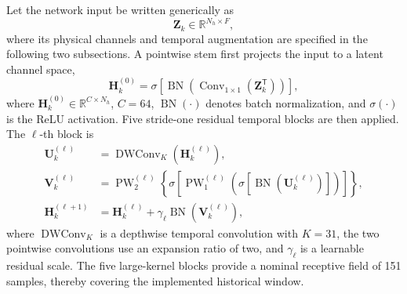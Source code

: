 \documentclass{ieeeaccess}
\begin{document}
Let the network input be written generically as
\begin{equation}
\mathbf Z_k\in\mathbb R^{N_h\times F},
\label{eq:generic_moderntcn_input}
\end{equation}
where its physical channels and temporal augmentation are specified in the following two subsections. A pointwise stem first projects the input to a latent channel space,
\begin{equation}
\mathbf H_k^{(0)}=\sigma\!\left[
\operatorname{BN}\!\left(
\operatorname{Conv}_{1\times1}(\mathbf Z_k^{\mathsf T})
\right)\right],
\label{eq:moderntcn_stem}
\end{equation}
where $\mathbf H_k^{(0)}\in\mathbb R^{C\times N_h}$, $C=64$, $\operatorname{BN}(\cdot)$ denotes batch normalization, and $\sigma(\cdot)$ is the ReLU activation. Five stride-one residual temporal blocks are then applied. The $\ell$-th block is
\begin{align}
\mathbf U_k^{(\ell)}
 &=\operatorname{DWConv}_{K}\!\left(\mathbf H_k^{(\ell)}\right),\nonumber\\
\mathbf V_k^{(\ell)}
 &=\operatorname{PW}_{2}^{(\ell)}\!\left\{
\sigma\!\left[\operatorname{PW}_{1}^{(\ell)}
\!\left(\sigma\!\left[\operatorname{BN}
(\mathbf U_k^{(\ell)})\right]\right)\right]\right\},\nonumber\\
\mathbf H_k^{(\ell+1)}
 &=\mathbf H_k^{(\ell)}
 +\gamma_{\ell}\operatorname{BN}\!\left(\mathbf V_k^{(\ell)}\right),
\label{eq:moderntcn_small_block}
\end{align}
where $\operatorname{DWConv}_{K}$ is a depthwise temporal convolution with $K=31$, the two pointwise convolutions use an expansion ratio of two, and $\gamma_{\ell}$ is a learnable residual scale. The five large-kernel blocks provide a nominal receptive field of 151 samples, thereby covering the implemented historical window.
\end{document}
